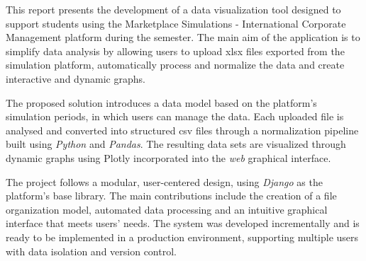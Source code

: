 This report presents the development of a data visualization tool designed to support students using the Marketplace Simulations - International Corporate Management platform during the semester. The main aim of the application is to simplify data analysis by allowing users to upload \gls{xlsx} files exported from the simulation platform, automatically process and normalize the data and create interactive and dynamic graphs.

The proposed solution introduces a data model based on the platform's simulation periods, in which users can manage the data. Each uploaded file is analysed and converted into structured \gls{csv} files through a normalization pipeline built using \textit{Python} and \textit{Pandas}. The resulting data sets are visualized through dynamic graphs using Plotly incorporated into the \textit{web} graphical interface.

The project follows a modular, user-centered design, using \textit{Django} as the platform's base library. The main contributions include the creation of a file organization model, automated data processing and an intuitive graphical interface that meets users' needs. The system was developed incrementally and is ready to be implemented in a production environment, supporting multiple users with data isolation and version control.